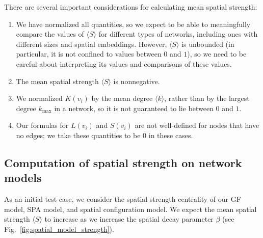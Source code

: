 \documentclass[%
 reprint,
 amsmath,amssymb,
 aps,
]{revtex4-1}
\begin{document}
There are several important considerations for calculating mean spatial strength:
\begin{enumerate}
    \item We have normalized all quantities, so we expect to be able to meaningfully compare the values of $\langle S \rangle$ for different types of networks, including ones with different sizes
     and spatial embeddings. However, $\langle S \rangle$ is unbounded (in particular, it is not confined to values between $0$ and $1$), so we need to be careful about interpreting its values and comparisons of these values.
    \item The mean spatial strength $\langle S \rangle$ is nonnegative.
    \item We normalized $K(v_i)$ by the mean degree $\langle k \rangle$, rather than by the largest degree $k_{\mathrm{max}}$ in a network, so it is not guaranteed to lie between $0$ and $1$.
    \item Our formulas for $L(v_i)$ and $S(v_i)$ are not well-defined for nodes that have no edges; we take these quantities to be $0$ in these cases.
\end{enumerate}


\subsection{Computation of spatial strength on network models}\label{sec:computed_ss}

As an initial test case, we consider the spatial strength centrality of our GF model, SPA model, and spatial configuration model. We expect the mean spatial strength $\langle S \rangle$ to increase as we increase the spatial decay parameter $\beta$ (see Fig.~\ref{fig:spatial_model_strength}).
\end{document}
